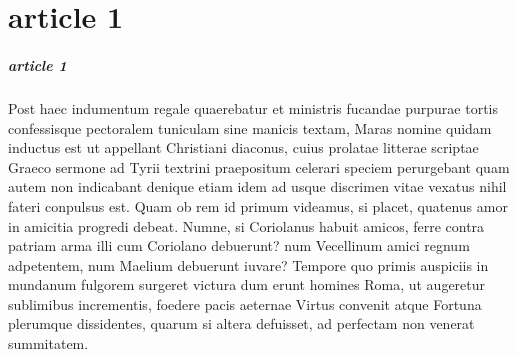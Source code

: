 \documentclass[a4paper,11pt]{report}
\begin{document}
\chapter{article 1}
\paragraph{article 1} Post haec indumentum regale quaerebatur et ministris fucandae purpurae tortis confessisque pectoralem tuniculam sine manicis textam, Maras nomine quidam inductus est ut appellant Christiani diaconus, cuius prolatae litterae scriptae Graeco sermone ad Tyrii textrini praepositum celerari speciem perurgebant quam autem non indicabant denique etiam idem ad usque discrimen vitae vexatus nihil fateri conpulsus est.
Quam ob rem id primum videamus, si placet, quatenus amor in amicitia progredi debeat. Numne, si Coriolanus habuit amicos, ferre contra patriam arma illi cum Coriolano debuerunt? num Vecellinum amici regnum adpetentem, num Maelium debuerunt iuvare?
Tempore quo primis auspiciis in mundanum fulgorem surgeret victura dum erunt homines Roma, ut augeretur sublimibus incrementis, foedere pacis aeternae Virtus convenit atque Fortuna plerumque dissidentes, quarum si altera defuisset, ad perfectam non venerat summitatem.
\end{document}
